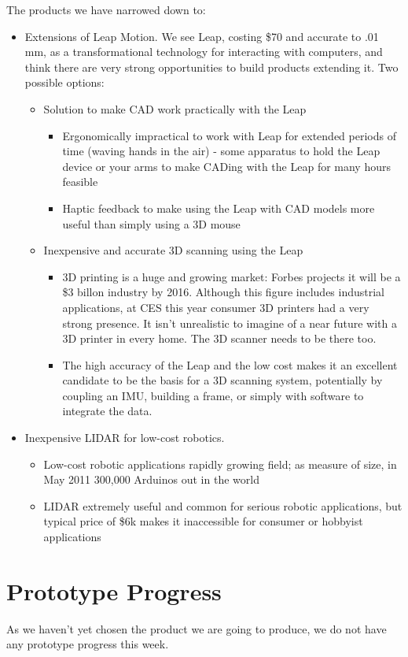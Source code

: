 \documentclass[10pt]{article}
\begin{document}
The products we have narrowed down to:
\begin{itemize}
\item Extensions of Leap Motion. We see Leap, costing \$70 and accurate to .01
  mm, as a transformational technology for interacting with computers, and think
  there are very strong opportunities to build products extending it. Two
  possible options:
\begin{itemize}
\item Solution to make CAD work practically with the Leap
\begin{itemize}
\item Ergonomically impractical to work with Leap for extended periods of time
  (waving hands in the air) - some apparatus to hold the Leap device or your
  arms to make CADing with the Leap for many hours feasible
\item Haptic feedback to make using the Leap with CAD models more useful than
  simply using a 3D mouse
\end{itemize}
\item Inexpensive and accurate 3D scanning using the Leap
\begin{itemize}
\item 3D printing is a huge and growing market: Forbes projects it will be a
  \$3 billon industry by 2016. Although this figure includes industrial applications,
  at CES this year consumer 3D printers had a very strong presence. It isn't unrealistic to
  imagine of a near future with a 3D printer in every home. The 3D scanner needs
  to be there too.
\item The high accuracy of the Leap and the low cost makes it an excellent candidate
  to be the basis for a 3D scanning system, potentially by coupling an
  IMU, building a frame, or simply with software to integrate the data.
\end{itemize}
\end{itemize}

\item Inexpensive LIDAR for low-cost robotics. 
\begin{itemize}
\item Low-cost robotic applications rapidly growing field; as measure of size,
  in May 2011 300,000 Arduinos out in the world
\item LIDAR extremely useful and common for serious robotic applications, but
  typical price of \$6k makes it inaccessible for consumer or hobbyist applications
\end{itemize}
\end{itemize}



\section{Prototype Progress}
As we haven't yet chosen the product we are going to produce, we do not have any
prototype progress this week. 
\end{document}
